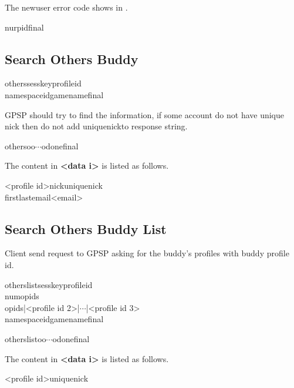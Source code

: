 \documentclass[oneside,titlepage,a4paper]{Definition/retrospy} %
\begin{document}
\ServerResponse
The newuser error code shows in .
\begin{mybox}
	\tbs nur\tbs<newuser error code>\tbs pid\tbs <profile id>\tbs final\tbs
\end{mybox}

\subsection{Search Others Buddy}
\ClientRequest

\begin{mybox}
	\tbs others\tbs\tbs sesskey\tbs<session key>\tbs profileid\tbs<profile id>\\\tbs namespaceid\tbs <namespace id>\tbs gamename\tbs<game name>\tbs final\tbs
\end{mybox}
\ServerResponse
GPSP should try to find the information, if some account do not have unique nick then do not add \tbs uniquenick\tbs to response string.
\begin{mybox}
\tbs others\tbs\tbs o\tbs o\tbs $\cdots$\tbs odone\tbs final\tbs
\end{mybox}
The content in \textbf{<data i>} is listed as follows.
\begin{mybox}
	<profile id>\tbs nick\tbs <nick name>\tbs uniquenick\tbs<unique nick>\\\tbs first\tbs<first name>\tbs last\tbs <last name>\tbs email\tbs<email>
\end{mybox}


\subsection{Search Others Buddy List}
Client send request to GPSP asking for the buddy's profiles with buddy profile id.
\ClientRequest

\begin{mybox}
	\tbs otherslist\tbs\tbs sesskey\tbs <session key>\tbs profileid\tbs<profile id>\\
	\tbs numopids\tbs<number of recieved buddy profiles>\\
	\tbs opids\tbs <profile id 1>|<profile id 2>|$\cdots$|<profile id 3>\\
	\tbs namespaceid\tbs <namespace id>\tbs gamename\tbs <game name>\tbs final\tbs
\end{mybox}
\ServerResponse

\begin{mybox}
	\tbs otherslist\tbs\tbs o\tbs<data 1>\tbs o\tbs<data 2>\tbs $\cdots$\tbs <data n>\tbs odone\tbs final\tbs
\end{mybox}
The content in \textbf{<data i>} is listed as follows.
\begin{mybox}
	<profile id>\tbs uniquenick\tbs <unique nick>
\end{mybox}
\end{document}
